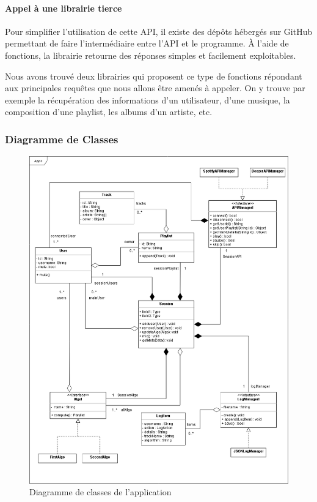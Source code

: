 \documentclass{article}
\begin{document}
		\paragraph{Appel à une librairie tierce}\mbox{}
								
		Pour simplifier l'utilisation de cette API, il existe des dépôts hébergés sur GitHub permettant de faire l'intermédiaire entre l'API et le programme. À l'aide de fonctions, la librairie retourne des réponses simples et facilement exploitables.
								
		Nous avons trouvé deux librairies \cite{spotify-web-api} \cite{spotify-web-api-node} qui proposent ce type de fonctions répondant aux principales requêtes que nous allons être amenés à appeler. On y trouve par exemple la récupération des informations d'un utilisateur, d'une musique, la composition d'une playlist, les albums d'un artiste, etc.
		\newpage
		\subsubsection{Diagramme de Classes}
		\begin{figure}[h!]
			\includegraphics[width=\linewidth]{ressources/diagramme_classes.png}
			\caption{Diagramme de classes de l'application}
		\end{figure}
		\newpage
\end{document}
